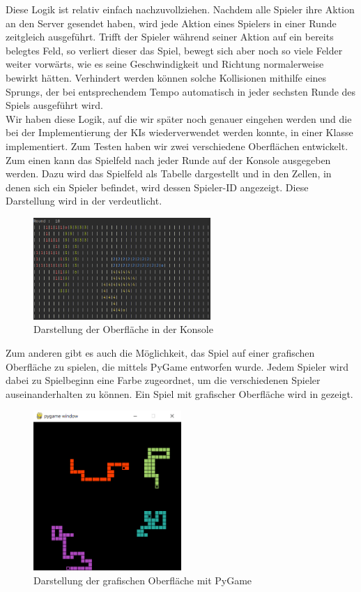 Diese Logik ist relativ einfach nachzuvollziehen.
Nachdem alle Spieler ihre Aktion an den Server gesendet haben, wird jede Aktion eines Spielers in einer Runde zeitgleich
ausgeführt.
Trifft der Spieler während seiner Aktion auf ein bereits belegtes Feld, so verliert dieser das Spiel, bewegt sich
aber noch so viele Felder weiter vorwärts, wie es seine Geschwindigkeit und Richtung normalerweise bewirkt hätten.
Verhindert werden können solche Kollisionen mithilfe eines Sprungs, der bei entsprechendem Tempo automatisch in jeder
sechsten Runde des Spiels ausgeführt wird. \\

Wir haben diese Logik, auf die wir später noch genauer eingehen werden und die bei der Implementierung der \ac{KI}s
wiederverwendet werden konnte, in einer Klasse  implementiert.
Zum Testen haben wir zwei verschiedene Oberflächen entwickelt.
Zum einen kann das Spielfeld nach jeder Runde auf der Konsole ausgegeben werden.
Dazu wird das Spielfeld als Tabelle dargestellt und in den Zellen, in denen sich ein Spieler befindet, wird dessen
Spieler-ID angezeigt.
Diese Darstellung wird in der  verdeutlicht.

\begin{figure}[htb]
\centering
\includegraphics[width=0.6\textwidth]{Bilder/KonsolenOberflaeche.png}
\caption{Darstellung der Oberfläche in der Konsole}
\label{fig:KonsolenOberflaeche}
\end{figure}

Zum anderen gibt es auch die Möglichkeit, das Spiel auf einer grafischen Oberfläche zu spielen, die mittels PyGame
 entworfen wurde.
Jedem Spieler wird dabei zu Spielbeginn eine Farbe zugeordnet, um die verschiedenen Spieler auseinanderhalten zu können.
Ein Spiel mit grafischer Oberfläche wird in  gezeigt.

\begin{figure}[htb]
\centering
\includegraphics[width=0.5\textwidth]{Bilder/GrafischeOberflaeche.png}
\caption{Darstellung der grafischen Oberfläche mit PyGame}
\label{fig:GrafischeOberflaeche}
\end{figure}

